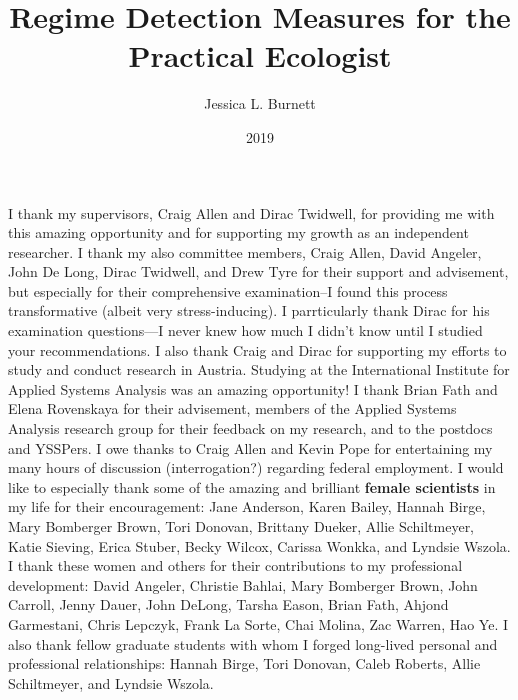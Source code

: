 \documentclass[12pt,twoside,openany]{reedthesis}
\title{Regime Detection Measures for the Practical Ecologist}
\author{Jessica L. Burnett}
\date{2019}
\begin{document}
  \maketitle

\frontmatter %
\pagestyle{empty} %

I thank my supervisors, Craig Allen and Dirac Twidwell, for providing me with this amazing opportunity and for supporting my growth as an independent researcher. I thank my also committee members, Craig Allen, David Angeler, John De Long, Dirac Twidwell, and Drew Tyre for their support and advisement, but especially for their comprehensive examination--I found this process transformative (albeit very stress-inducing). I parrticularly thank Dirac for his examination questions---I never knew how much I didn't know until I studied your recommendations. I also thank Craig and Dirac for supporting my efforts to study and conduct research in Austria.
Studying at the International Institute for Applied Systems Analysis was an amazing opportunity! I thank Brian Fath and Elena Rovenskaya for their advisement, members of the Applied Systems Analysis research group for their feedback on my research, and to the postdocs and YSSPers. I owe thanks to Craig Allen and Kevin Pope for entertaining my many hours of discussion (interrogation?) regarding federal employment.
I would like to especially thank some of the amazing and brilliant \textbf{female scientists} in my life for their encouragement: Jane Anderson, Karen Bailey, Hannah Birge, Mary Bomberger Brown, Tori Donovan, Brittany Dueker, Allie Schiltmeyer, Katie Sieving, Erica Stuber, Becky Wilcox, Carissa Wonkka, and Lyndsie Wszola. I thank these women and others for their contributions to my professional development: David Angeler, Christie Bahlai, Mary Bomberger Brown, John Carroll, Jenny Dauer, John DeLong, Tarsha Eason, Brian Fath, Ahjond Garmestani, Chris Lepczyk, Frank La Sorte, Chai Molina, Zac Warren, Hao Ye. I also thank fellow graduate students with whom I forged long-lived personal and professional relationships: Hannah Birge, Tori Donovan, Caleb Roberts, Allie Schiltmeyer, and Lyndsie Wszola.
\end{document}
